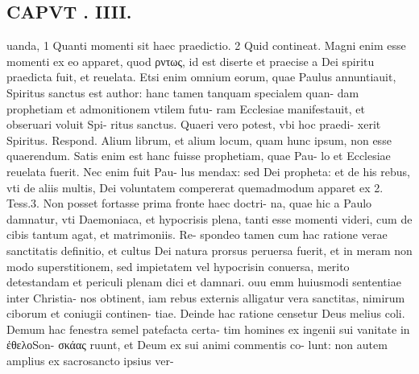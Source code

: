 \documentclass{article}
\begin{document}
\begin{pages}
\section*{CAPVT . IIII. }
\marginpar{[ p.181 ]}\pstart uanda, 1 Quanti momenti sit haec praedictio. 2 Quid contineat. Magni enim esse momenti ex eo apparet, quod ρντως, id est diserte et praecise a Dei spiritu praedicta fuit, et reuelata. Etsi enim omnium eorum, quae Paulus annuntiauit, Spiritus sanctus est author: hanc tamen tanquam specialem quan- dam prophetiam et admonitionem vtilem futu- ram Ecclesiae manifestauit, et obseruari voluit Spi- ritus sanctus. Quaeri vero potest, vbi hoc praedi- xerit Spiritus. Respond. Alium librum, et alium locum, quam hunc ipsum, non esse quaerendum. Satis enim est hanc fuisse prophetiam, quae Pau- lo et Ecclesiae reuelata fuerit. Nec enim fuit Pau- lus mendax: sed Dei propheta: et de his rebus, vti de aliis multis, Dei voluntatem compererat quemadmodum apparet ex 2. Tess.3. Non posset fortasse prima fronte haec doctri- na, quae hic a Paulo damnatur, vti Daemoniaca, et hypocrisis plena, tanti esse momenti videri, cum de cibis tantum agat, et matrimoniis. Re- spondeo tamen cum hac ratione verae sanctitatis definitio, et cultus Dei natura prorsus peruersa fuerit, et in meram non modo superstitionem, sed impietatem vel hypocrisin conuersa, merito detestandam et periculi plenam dici et damnari. ouu emm huiusmodi sententiae inter Christia- nos obtinent, iam rebus externis alligatur vera sanctitas, nimirum ciborum et coniugii continen- tiae. Deinde hac ratione censetur Deus melius coli. Demum hac fenestra semel patefacta certa- tim homines ex ingenii sui vanitate in ἐθελοSon- σκάας ruunt, et Deum ex sui animi commentis co- lunt: non autem amplius ex sacrosancto ipsius ver-  \pend

\end{pages}
\end{document}
